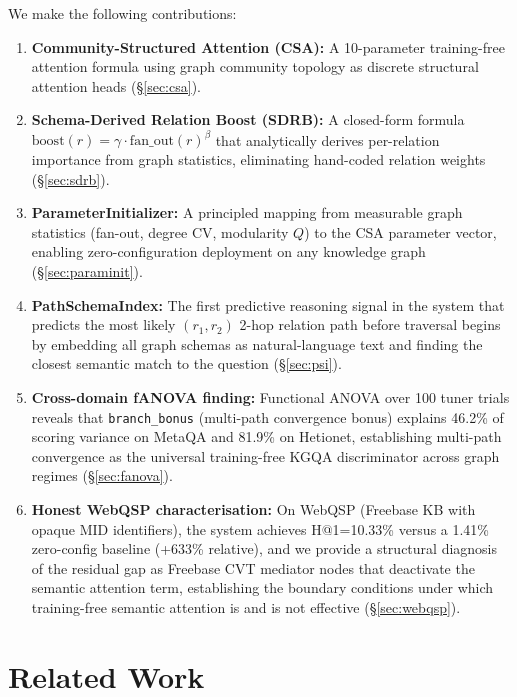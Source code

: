 \documentclass[11pt,a4paper]{article}
\begin{document}
We make the following contributions:

\begin{enumerate}
  \item \textbf{Community-Structured Attention (CSA):} A 10-parameter
    training-free attention formula using graph community topology as discrete
    structural attention heads (\S\ref{sec:csa}).
  \item \textbf{Schema-Derived Relation Boost (SDRB):} A closed-form formula
    $\mathrm{boost}(r) = \gamma \cdot \mathrm{fan\_out}(r)^{\beta}$ that
    analytically derives per-relation importance from graph statistics,
    eliminating hand-coded relation weights (\S\ref{sec:sdrb}).
  \item \textbf{ParameterInitializer:} A principled mapping from measurable
    graph statistics (fan-out, degree CV, modularity $Q$) to the CSA parameter
    vector, enabling zero-configuration deployment on any knowledge graph
    (\S\ref{sec:paraminit}).
  \item \textbf{PathSchemaIndex:} The first predictive reasoning signal in the
    system that predicts the most likely $(r_1, r_2)$ 2-hop relation path before
    traversal begins by embedding all graph schemas as natural-language text and
    finding the closest semantic match to the question (\S\ref{sec:psi}).
  \item \textbf{Cross-domain fANOVA finding:} Functional ANOVA over 100 tuner
    trials reveals that \texttt{branch\_bonus} (multi-path convergence bonus)
    explains 46.2\% of scoring variance on MetaQA and 81.9\% on Hetionet,
    establishing multi-path convergence as the universal training-free KGQA
    discriminator across graph regimes (\S\ref{sec:fanova}).
  \item \textbf{Honest WebQSP characterisation:} On WebQSP (Freebase KB with
    opaque MID identifiers), the system achieves H@1=10.33\% versus a 1.41\%
    zero-config baseline (+633\% relative), and we provide a structural diagnosis
    of the residual gap as Freebase CVT mediator nodes that deactivate the
    semantic attention term, establishing the boundary conditions under which
    training-free semantic attention is and is not effective (\S\ref{sec:webqsp}).
\end{enumerate}

\section{Related Work}
\end{document}
